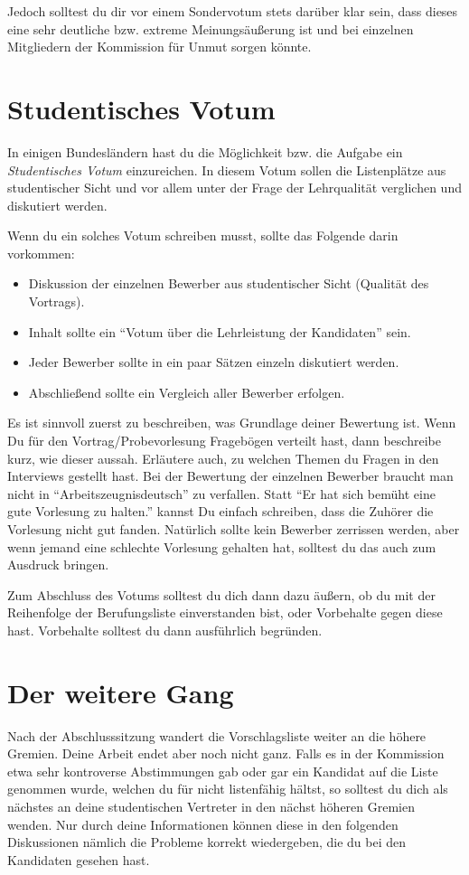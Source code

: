 \documentclass[10pt,twoside,a5paper,openright]{book}
\begin{document}
Jedoch solltest du dir vor einem Sondervotum stets darüber klar sein, dass dieses eine sehr deutliche bzw. extreme Meinungsäußerung ist und bei einzelnen Mitgliedern der Kommission für Unmut sorgen könnte.

\section{Studentisches Votum}
In einigen Bundesländern hast du die Möglichkeit bzw. die Aufgabe ein \emph{Studentisches Votum} einzureichen. In diesem Votum sollen die Listenplätze aus studentischer Sicht und vor allem unter der Frage der Lehrqualität verglichen und diskutiert werden.

Wenn du ein solches Votum schreiben musst, sollte das Folgende darin vorkommen:
\begin{itemize}
	\item Diskussion der einzelnen Bewerber aus studentischer Sicht (Qualität des Vortrags).
	\item Inhalt sollte ein "`Votum über die Lehrleistung der Kandidaten"' sein.
	\item Jeder Bewerber sollte in ein paar Sätzen einzeln diskutiert werden.
	\item Abschließend sollte ein Vergleich aller Bewerber erfolgen.
\end{itemize}

Es ist sinnvoll zuerst zu beschreiben, was Grundlage deiner Bewertung ist. Wenn Du für den Vortrag/Probevorlesung Fragebögen verteilt hast, dann beschreibe kurz, wie dieser aussah. Erläutere auch, zu welchen Themen du Fragen in den Interviews gestellt hast. Bei der Bewertung der einzelnen Bewerber braucht man nicht in "`Arbeitszeugnisdeutsch"' zu verfallen. Statt "`Er hat sich bemüht eine gute Vorlesung zu halten."' kannst Du einfach schreiben, dass die Zuhörer die Vorlesung nicht gut fanden. Natürlich sollte kein Bewerber zerrissen werden, aber wenn jemand eine schlechte Vorlesung gehalten hat, solltest du das auch zum Ausdruck bringen. 

Zum Abschluss des Votums solltest du dich dann dazu äußern, ob du mit der Reihenfolge der Berufungsliste
einverstanden bist, oder Vorbehalte gegen diese hast. Vorbehalte solltest du dann ausführlich begründen.

\section{Der weitere Gang}
Nach der Abschlusssitzung wandert die Vorschlagsliste weiter an die höhere Gremien. Deine Arbeit endet aber noch nicht ganz. Falls es in der Kommission etwa sehr kontroverse Abstimmungen gab oder gar ein Kandidat auf die Liste genommen wurde, welchen du für nicht listenfähig hältst, so solltest du dich als nächstes an deine studentischen Vertreter in den nächst höheren Gremien wenden. Nur durch deine Informationen können diese in den folgenden Diskussionen nämlich die Probleme korrekt wiedergeben, die du bei den Kandidaten gesehen hast.
\end{document}
